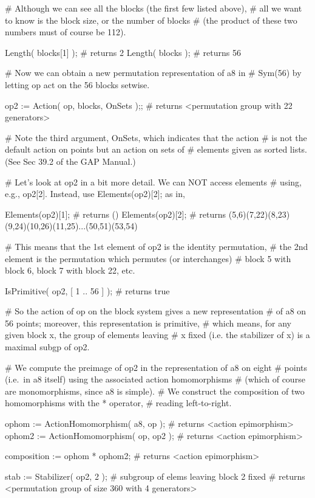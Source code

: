 # Although we can see all the blocks (the first few listed above),
# all we want to know is the block size, or the number of blocks
# (the product of these two numbers must of course be 112). 

Length( blocks[1] );   # returns 2
Length( blocks );      # returns 56

# Now we can obtain a new permutation representation of a8 in 
# Sym(56) by letting op act on the 56 blocks setwise.

op2 := Action( op, blocks, OnSets );;
# returns <permutation group with 22 generators>

# Note the third argument, OnSets, which indicates that the action 
# is not the default action on points but an action on sets of 
# elements given as sorted lists. (See Sec 39.2 of the GAP Manual.)

# Let's look at op2 in a bit more detail.  We can NOT access elements
# using, e.g., op2[2].  Instead, use Elements(op2)[2]; as in,

Elements(op2)[1];   # returns ()
Elements(op2)[2];
# returns (5,6)(7,22)(8,23)(9,24)(10,26)(11,25)...(50,51)(53,54)

# This means that the 1st element of op2 is the identity permutation,
# the 2nd element is the permutation which permutes (or interchanges)
# block 5 with block 6, block 7 with block 22, etc.

IsPrimitive( op2, [ 1 .. 56 ] );      # returns true

# So the action of op on the block system gives a new representation 
# of a8 on 56 points; moreover, this representation is primitive, 
# which means, for any given block x, the group of elements leaving 
# x fixed (i.e. the stabilizer of x) is a maximal subgp of op2.

# We compute the preimage of op2 in the representation of a8 on eight 
# points (i.e.~in a8 itself) using the associated action homomorphisms 
# (which of course are monomorphisms, since a8 is simple). 
# We construct the composition of two homomorphisms with the * operator, 
# reading left-to-right.

ophom := ActionHomomorphism( a8, op );    # returns <action epimorphism>
ophom2 := ActionHomomorphism( op, op2 );  # returns <action epimorphism>

composition := ophom * ophom2; # returns <action epimorphism>

stab := Stabilizer( op2, 2 );  # subgroup of elems leaving block 2 fixed
# returns <permutation group of size 360 with 4 generators>

